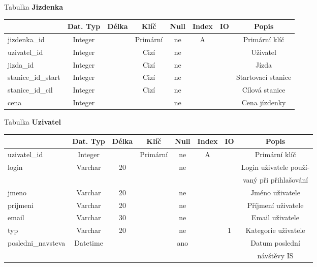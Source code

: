 \documentclass[11pt]{article}
\begin{document}
\noindent
Tabulka \textbf{Jizdenka}

\begin{table}[H]
    \begin{tabular}{|l|c|c|c|c|c|c|c|} \hline
                            & Dat. Typ  & Délka & Klíč      & Null  & Index & IO    & Popis \\ \hline
        jizdenka\_id	    & Integer	&	    & Primární	& ne	& A		&       & Primární klíč \\ \hline
        uzivatel\_id	    & Integer	&	    & Cizí	    & ne	&		&       & Uživatel \\ \hline
        jizda\_id	        & Integer	&	    & Cizí	    & ne	&		&       & Jízda \\ \hline
        stanice\_id\_start	& Integer	&	    & Cizí	    & ne	&		&       & Startovací stanice \\ \hline
        stanice\_id\_cil	& Integer	&	    & Cizí	    & ne	&		&       & Cílová stanice \\ \hline
        cena	            & Integer	&	    & 	        & ne	&		&       & Cena jízdenky \\ \hline
    \end{tabular}
\end{table}

\newpage

\noindent
Tabulka \textbf{Uzivatel}

\begin{table}[H]
    \begin{tabular}{|l|c|c|c|c|c|c|c|} \hline
                            & Dat. Typ  & Délka & Klíč      & Null  & Index & IO    & Popis \\ \hline
        uzivatel\_id	    & Integer	&	    & Primární	& ne	& A		&       & Primární klíč \\ \hline
        login	            & Varchar	& 20	& 	        & ne	&	    & 	    & Login uživatele použí-\\ &&&&&&& vaný při přihlašování \\ \hline
        jmeno	            & Varchar	& 20	& 	        & ne	&	    & 	    & Jméno uživatele \\ \hline
        prijmeni	        & Varchar	& 20	& 	        & ne	&	    & 	    & Příjmení uživatele \\ \hline
        email	            & Varchar	& 30	& 	        & ne	&	    & 	    & Email uživatele \\ \hline
        typ	                & Varchar	& 20	& 	        & ne	&	    & 1     & Kategorie uživatele \\ \hline
        posledni\_navsteva	& Datetime	& 		&           & ano	&		&       & Datum poslední\\ &&&&&&& návštěvy IS \\ \hline
    \end{tabular}
\end{table}
\end{document}
